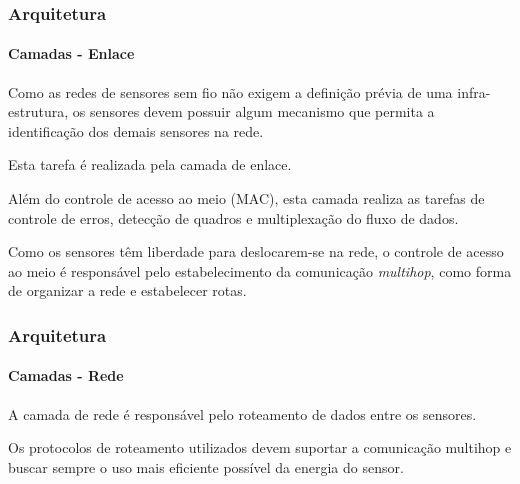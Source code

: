 \documentclass[notes]{beamer}
\begin{document}
\begin{frame}
\frametitle{Arquitetura}
\framesubtitle{Camadas - Enlace}

\begin{block}

Como as redes de sensores sem fio não exigem a definição prévia de uma infra-estrutura, os sensores devem possuir algum mecanismo que permita a identificação dos demais sensores na rede. 
\end{block} \pause

\begin{block}

Esta tarefa é realizada pela camada de enlace.

\end{block} \pause

\begin{block}

Além do controle de acesso ao meio (MAC), esta camada realiza as tarefas de controle de erros, detecção de quadros e multiplexação do fluxo de dados.

\end{block} \pause

\begin{block}

Como os sensores têm liberdade para deslocarem-se na rede, o controle de acesso ao meio é responsável pelo estabelecimento da comunicação \textit{multihop}, como forma de organizar a rede e estabelecer rotas.

\end{block}

\end{frame}

\begin{frame}
\frametitle{Arquitetura}
\framesubtitle{Camadas - Rede}

\begin{block}

A camada de rede é responsável pelo roteamento de dados entre os sensores. 

\end{block} \pause

\begin{alertblock}

Os protocolos de roteamento utilizados devem suportar a comunicação multihop e buscar sempre o uso mais eficiente possível da energia do sensor.

\end{alertblock}

\end{frame}
\end{document}
